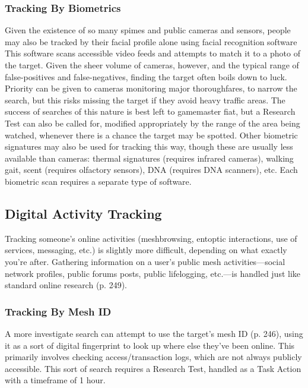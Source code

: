 \subsubsection{Tracking By Biometrics} 

Given the existence of so many spimes and public cameras and sensors, people may also be tracked by their facial profile alone using facial recognition software This software scans accessible video feeds and attempts to match it to a photo of the target. Given the sheer volume of cameras, however, and the typical range of false-positives and false-negatives, finding the target often boils down to luck. Priority can be given to cameras monitoring major thoroughfares, to narrow the search, but this risks missing the target if they avoid heavy traffic areas. The success of searches of this nature is best left to gamemaster fiat, but a Research Test can also be called for, modified appropriately by the range of the area being watched, whenever there is a chance the target may be spotted. Other biometric signatures may also be used for tracking this way, though these are usually less available than cameras: thermal signatures (requires infrared cameras), walking gait, scent (requires olfactory sensors), DNA (requires DNA scanners), etc. Each biometric scan requires a separate type of software. 



\subsection{Digital Activity Tracking} 

Tracking someone's online activities (meshbrowsing, entoptic interactions, use of services, messaging, etc.) is slightly more difficult, depending on what exactly you're after. Gathering information on a user's public mesh activities—social network profiles, public forums posts, public lifelogging, etc.—is handled just like standard online research (p. 249). 

\subsubsection{Tracking By Mesh ID} 

A more investigate search can attempt to use the target's mesh ID (p. 246), using it as a sort of digital fingerprint to look up where else they've been online. This primarily involves checking access/transaction logs, which are not always publicly accessible. This sort of search requires a Research Test, handled as a Task Action with a timeframe of 1 hour. 


